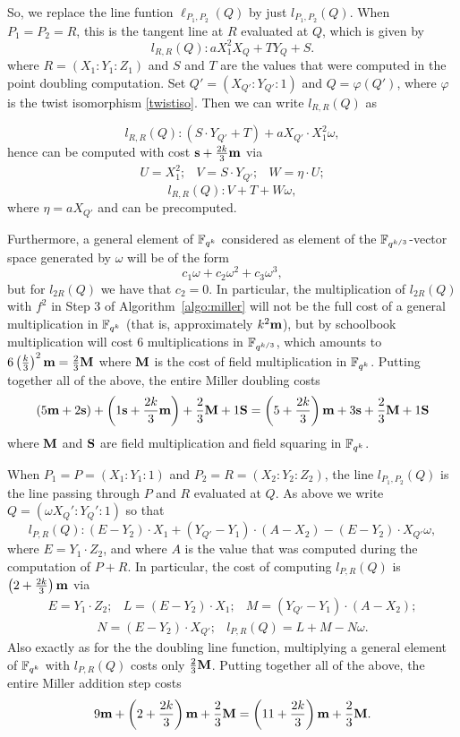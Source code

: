 So, we replace the line funtion $\ell_{P_1,P_2}(Q)$ by just $l_{P_1,P_2}(Q)$.
When $P_1 = P_2 = R$, this is the tangent line at $R$ evaluated at $Q$, which is given by
\[l_{R,R}(Q): aX_1^2 X_Q + T Y_Q + S.\]
where $R = (X_1:Y_1:Z_1)$ 
and $S$ and $T$ are the values that were computed in the point doubling computation.
Set $Q' = (X_{Q'}:Y_{Q'}:1)$ and $Q = \varphi(Q')$, where
$\varphi$ is the twist isomorphism \eqref{twistiso}.
Then we can write $l_{R,R}(Q)$ as

\[l_{R,R}(Q): (S \cdot Y_{Q'} + T) + a X_{Q'} \cdot X_1^2 \omega,\]
hence can be computed with cost $\textbf{s} + \frac{2k}{3}\textbf{m}$ via
\[\begin{array}{ccc}
U = X_1^2; & V = S \cdot Y_{Q'}; & W = \eta \cdot U;
\end{array}\]
\[l_{R,R}(Q): V+T + W\omega,\]
where $\eta = aX_{Q'}$ and can be precomputed.

Furthermore, a general element of $\mathbb{F}_{q^k}$ considered as element of the $\mathbb{F}_{q^{k/3}}$-vector space generated
by $\omega$ will be of the form 
\[c_1 \omega + c_2 \omega^2 + c_3 \omega^3,\]
but for $l_{2R}(Q)$ we have that $c_2 = 0$. In particular, the multiplication of $l_{2R}(Q)$ with $f^2$ in
Step 3 of Algorithm~\ref{algo:miller} will not be the full cost of a general multiplication in $\mathbb{F}_{q^k}$ (that
is, approximately $k^2\textbf{m}$), but by schoolbook multiplication will cost 6 multiplications in $\mathbb{F}_{q^{k/3}}$, which
amounts to $6 \left(\frac{k}{3}\right)^2 \textbf{m} = \frac{2}{3} \textbf{M}$
where $\textbf{M}$ is the cost of field multiplication in $\mathbb{F}_{q^k}$.
Putting together all of the above, the entire Miller doubling costs
\[(5\textbf{m} + 2\textbf{s}) + \left(1\textbf{s} + \frac{2k}{3}\textbf{m}\right) + \frac{2}{3}\textbf{M}  + 1\textbf{S} 
= \left( 5 + \frac{2k}{3}\right)\textbf{m} + 3\textbf{s} + \frac{2}{3}\textbf{M} + 1\textbf{S}\]
where $\textbf{M}$ and $\textbf{S}$ are field multiplication and field squaring in $\mathbb{F}_{q^k}$.

When $P_1  = P = (X_1:Y_1:1)$ and $P_2 = R = (X_2:Y_2:Z_2)$, 
the line $l_{P_1,P_2}(Q)$ is the line passing through $P$ and $R$ evaluated at $Q$.
As above we write $Q = (\omega X_Q':Y_Q':1)$ so that
$$l_{P,R}(Q): (E - Y_2) \cdot X_1 + (Y_{Q'} - Y_1) \cdot (A - X_2) - (E - Y_2) \cdot X_{Q'}\omega,  $$
where $E = Y_1 \cdot Z_2$, and where $A$ is the value that was computed during the computation of $P+R$.
In particular, the cost of computing $l_{P,R}(Q)$ is $\left(2 + \frac{2k}{3}\right)\textbf{m}$ via
\[\begin{array}{ccc}
E = Y_1 \cdot Z_2; & L = (E-Y_2)\cdot X_1; 
& M = (Y_{Q'} - Y_1) \cdot (A - X_2); 
\end{array}\]
\[\begin{array}{cc}
N = (E - Y_2) \cdot X_{Q'}; &
l_{P,R}(Q) = L + M - N\omega.
\end{array}\]
Also exactly as for the the doubling line function, multiplying a general element of $\mathbb{F}_{q^k}$ with $l_{P,R}(Q)$ costs only
$\frac{2}{3}\textbf{M}$.
Putting together all of the above, the entire Miller addition step costs
\[9\textbf{m} + \left(2 + \frac{2k}{3}\right)\textbf{m} + \frac{2}{3}\textbf{M} 
= \left(11 + \frac{2k}{3}\right)\textbf{m} + \frac{2}{3}\textbf{M}.\]

